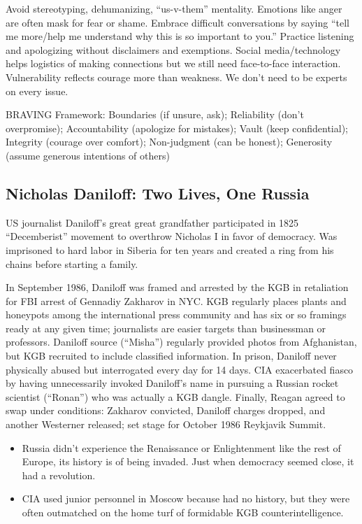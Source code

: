 \documentclass[
]{article}
\begin{document}
Avoid stereotyping, dehumanizing, ``us-v-them'' mentality. Emotions like
anger are often mask for fear or shame. Embrace difficult conversations
by saying ``tell me more/help me understand why this is so important to
you.'' Practice listening and apologizing without disclaimers and
exemptions. Social media/technology helps logistics of making
connections but we still need face-to-face interaction. Vulnerability
reflects courage more than weakness. We don't need to be experts on
every issue.

BRAVING Framework: Boundaries (if unsure, ask); Reliability (don't
overpromise); Accountability (apologize for mistakes); Vault (keep
confidential); Integrity (courage over comfort); Non-judgment (can be
honest); Generosity (assume generous intentions of others)

\hypertarget{nicholas-daniloff-two-lives-one-russia}{%
\subsection{Nicholas Daniloff: Two Lives, One
Russia}\label{nicholas-daniloff-two-lives-one-russia}}

US journalist Daniloff's great great grandfather participated in 1825
``Decemberist'' movement to overthrow Nicholas I in favor of democracy.
Was imprisoned to hard labor in Siberia for ten years and created a ring
from his chains before starting a family.

In September 1986, Daniloff was framed and arrested by the KGB in
retaliation for FBI arrest of Gennadiy Zakharov in NYC. KGB regularly
places plants and honeypots among the international press community and
has six or so framings ready at any given time; journalists are easier
targets than businessman or professors. Daniloff source (``Misha'')
regularly provided photos from Afghanistan, but KGB recruited to include
classified information. In prison, Daniloff never physically abused but
interrogated every day for 14 days. CIA exacerbated fiasco by having
unnecessarily invoked Daniloff's name in pursuing a Russian rocket
scientist (``Ronan'') who was actually a KGB dangle. Finally, Reagan
agreed to swap under conditions: Zakharov convicted, Daniloff charges
dropped, and another Westerner released; set stage for October 1986
Reykjavik Summit.

\begin{itemize}
\item
  Russia didn't experience the Renaissance or Enlightenment like the
  rest of Europe, its history is of being invaded. Just when democracy
  seemed close, it had a revolution.
\item
  CIA used junior personnel in Moscow because had no history, but they
  were often outmatched on the home turf of formidable KGB
  counterintelligence.
\end{itemize}
\end{document}
